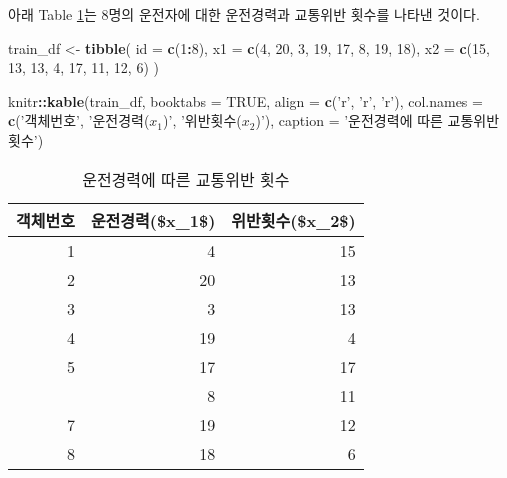 \documentclass[]{book}
\newenvironment{Shaded}{\begin{snugshade}}{\end{snugshade}}
\newcommand{\DataTypeTok}[1]{\textcolor[rgb]{0.13,0.29,0.53}{#1}}
\newcommand{\DecValTok}[1]{\textcolor[rgb]{0.00,0.00,0.81}{#1}}
\newcommand{\KeywordTok}[1]{\textcolor[rgb]{0.13,0.29,0.53}{\textbf{#1}}}
\newcommand{\NormalTok}[1]{#1}
\newcommand{\OperatorTok}[1]{\textcolor[rgb]{0.81,0.36,0.00}{\textbf{#1}}}
\newcommand{\OtherTok}[1]{\textcolor[rgb]{0.56,0.35,0.01}{#1}}
\newcommand{\StringTok}[1]{\textcolor[rgb]{0.31,0.60,0.02}{#1}}
\begin{document}
아래 Table \ref{tab:driver-data}는 8명의 운전자에 대한 운전경력과 교통위반 횟수를 나타낸 것이다.

\begin{Shaded}
\begin{Highlighting}[]
\NormalTok{train_df <-}\StringTok{ }\KeywordTok{tibble}\NormalTok{(}
  \DataTypeTok{id =} \KeywordTok{c}\NormalTok{(}\DecValTok{1}\OperatorTok{:}\DecValTok{8}\NormalTok{),}
  \DataTypeTok{x1 =} \KeywordTok{c}\NormalTok{(}\DecValTok{4}\NormalTok{, }\DecValTok{20}\NormalTok{, }\DecValTok{3}\NormalTok{, }\DecValTok{19}\NormalTok{, }\DecValTok{17}\NormalTok{, }\DecValTok{8}\NormalTok{, }\DecValTok{19}\NormalTok{, }\DecValTok{18}\NormalTok{),}
  \DataTypeTok{x2 =} \KeywordTok{c}\NormalTok{(}\DecValTok{15}\NormalTok{, }\DecValTok{13}\NormalTok{, }\DecValTok{13}\NormalTok{, }\DecValTok{4}\NormalTok{, }\DecValTok{17}\NormalTok{, }\DecValTok{11}\NormalTok{, }\DecValTok{12}\NormalTok{, }\DecValTok{6}\NormalTok{)}
\NormalTok{)}

\NormalTok{knitr}\OperatorTok{::}\KeywordTok{kable}\NormalTok{(train_df, }\DataTypeTok{booktabs =} \OtherTok{TRUE}\NormalTok{,}
             \DataTypeTok{align =} \KeywordTok{c}\NormalTok{(}\StringTok{'r'}\NormalTok{, }\StringTok{'r'}\NormalTok{, }\StringTok{'r'}\NormalTok{),}
             \DataTypeTok{col.names =} \KeywordTok{c}\NormalTok{(}\StringTok{'객체번호'}\NormalTok{, }\StringTok{'운전경력($x_1$)'}\NormalTok{, }\StringTok{'위반횟수($x_2$)'}\NormalTok{),}
             \DataTypeTok{caption =} \StringTok{'운전경력에 따른 교통위반 횟수'}\NormalTok{)}
\end{Highlighting}
\end{Shaded}

\begin{table}[t]

\caption{\label{tab:driver-data}운전경력에 따른 교통위반 횟수}
\centering
\begin{tabular}{rrr}
\toprule
객체번호 & 운전경력(\$x\_1\$) & 위반횟수(\$x\_2\$)\\
\midrule
1 & 4 & 15\\
2 & 20 & 13\\
3 & 3 & 13\\
4 & 19 & 4\\
5 & 17 & 17\\
\addlinespace
6 & 8 & 11\\
7 & 19 & 12\\
8 & 18 & 6\\
\bottomrule
\end{tabular}
\end{table}
\end{document}
